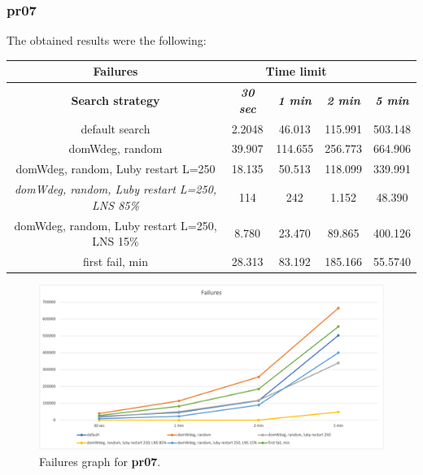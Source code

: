 \subsubsection{pr07}
The obtained results were the following:
{
\renewcommand{\arraystretch}{2}
\begin{longtable}[h]{| c | c | c | c | c |}
    \hline
    \textbf{Failures} & \multicolumn{3}{c}{Time limit} & \\
    \hline
    \textbf{Search strategy} & \textbf{\textit{30 sec}} & \textbf{\textit{1 min}} & \textbf{\textit{2 min}} & \textbf{\textit{5 min}} \\
    \hline
    \endhead
    default search                                         & 2.2048 &  46.013 & 115.991 & 503.148 \\
    \hline
    domWdeg, random                                        & 39.907 & 114.655 & 256.773 & 664.906 \\
    \hline
    domWdeg, random, Luby restart L=250                    & 18.135 &  50.513 & 118.099 & 339.991 \\
    \hline
    \textit{domWdeg, random, Luby restart L=250, LNS 85\%} &   114 &    242 &   1.152 &  48.390 \\
    \hline
    domWdeg, random, Luby restart L=250, LNS 15\%          &  8.780 &  23.470 &  89.865 & 400.126 \\
    \hline
    first fail, min                                        & 28.313 &  83.192 & 185.166 & 55.5740 \\
    \hline
\end{longtable}
}
\begin{figure}[H]
    \centering
    \includegraphics[width=0.8\columnwidth]{../graphs/pr07-failures.png}
    \caption{Failures graph for \textbf{pr07}.}
\end{figure}

